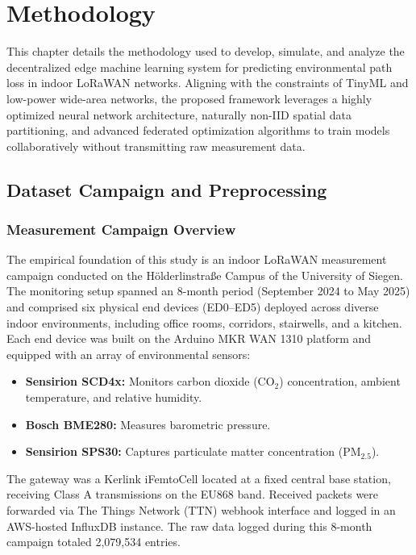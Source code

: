 \chapter{Methodology}
\label{ch:methodology}

This chapter details the methodology used to develop, simulate, and analyze the decentralized edge machine learning system for predicting environmental path loss in indoor LoRaWAN networks. Aligning with the constraints of TinyML and low-power wide-area networks, the proposed framework leverages a highly optimized neural network architecture, naturally non-IID spatial data partitioning, and advanced federated optimization algorithms to train models collaboratively without transmitting raw measurement data.

\section{Dataset Campaign and Preprocessing}
\label{sec:dataset-campaign}

\subsection{Measurement Campaign Overview}
The empirical foundation of this study is an indoor LoRaWAN measurement campaign conducted on the Hölderlinstraße Campus of the University of Siegen. The monitoring setup spanned an 8-month period (September 2024 to May 2025) and comprised six physical end devices (ED0–ED5) deployed across diverse indoor environments, including office rooms, corridors, stairwells, and a kitchen. Each end device was built on the Arduino MKR WAN 1310 platform and equipped with an array of environmental sensors:
\begin{itemize}
    \item \textbf{Sensirion SCD4x:} Monitors carbon dioxide ($\text{CO}_2$) concentration, ambient temperature, and relative humidity.
    \item \textbf{Bosch BME280:} Measures barometric pressure.
    \item \textbf{Sensirion SPS30:} Captures particulate matter concentration ($\text{PM}_{2.5}$).
\end{itemize}
The gateway was a Kerlink iFemtoCell located at a fixed central base station, receiving Class A transmissions on the EU868 band. Received packets were forwarded via The Things Network (TTN) webhook interface and logged in an AWS-hosted InfluxDB instance. The raw data logged during this 8-month campaign totaled 2,079,534 entries.

